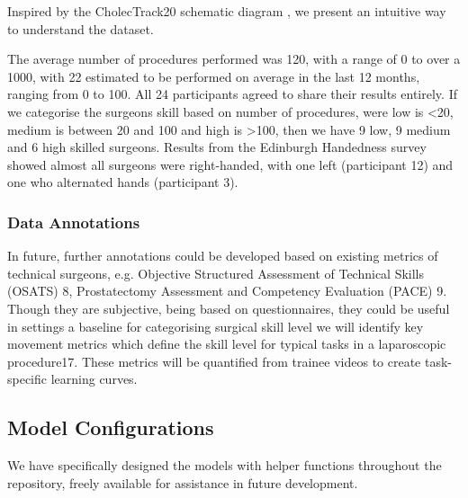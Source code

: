 Inspired by the CholecTrack20 schematic diagram \cite{nwoye_cholectrack20_2023}, we present an intuitive way to understand the dataset.

The average number of procedures performed was 120, with a range of 0 to over a 1000, with 22 estimated to be performed on average in the last 12 months, ranging from 0 to 100. All 24 participants agreed to share their results entirely. If we categorise the surgeons skill based on number of procedures, were low is <20, medium is between 20 and 100 and high is >100, then we have 9 low, 9 medium and 6 high skilled surgeons. Results from the Edinburgh Handedness survey \cite{oldfield_assessment_1971} showed almost all surgeons were right-handed, with one left (participant 12) and one who alternated hands (participant 3).

\subsubsection{Data Annotations}



In future, further annotations could be developed based on existing metrics of technical surgeons, e.g. Objective Structured Assessment of Technical Skills (OSATS) 8, Prostatectomy Assessment and Competency Evaluation (PACE) 9.
Though they are subjective, being based on questionnaires, they could be useful in settings a baseline for categorising surgical skill level 
we will identify key movement metrics which define the skill level for typical tasks in a laparoscopic procedure17. These metrics will be quantified from trainee videos to create task-specific learning curves.


\subsection{Model Configurations}

We have specifically designed the models with helper functions throughout the repository, freely available for assistance in future development.


